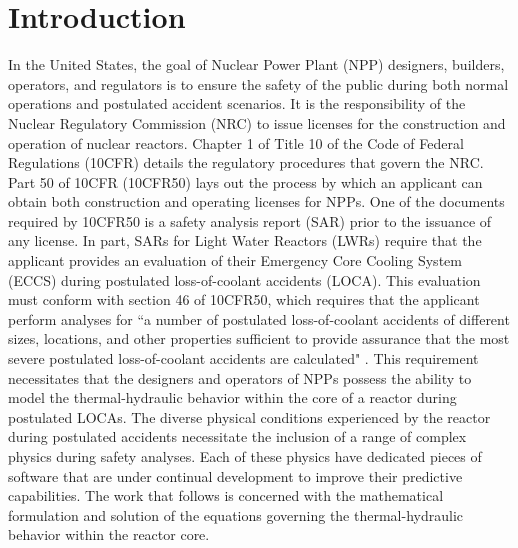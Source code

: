 \chapter{Introduction}
\label{chap:intro}
In the United States, the goal of Nuclear Power Plant (NPP) designers, builders, operators, and regulators is to ensure the safety of the public during both normal operations and postulated accident scenarios.
It is the responsibility of the Nuclear Regulatory Commission (NRC) to issue licenses for the construction and operation of nuclear reactors.
Chapter 1 of Title 10 of the Code of Federal Regulations (10CFR) details the regulatory procedures that govern the NRC.
Part 50 of 10CFR (10CFR50) lays out the process by which an applicant can obtain both construction and operating licenses for NPPs.
One of the documents required by 10CFR50 is a safety analysis report (SAR) prior to the issuance of any license.
In part, SARs for Light Water Reactors (LWRs) require that the applicant provides an evaluation of their Emergency Core Cooling System (ECCS) during postulated loss-of-coolant accidents (LOCA).
This evaluation must conform with section 46 of 10CFR50, which requires that the applicant perform analyses for ``a number of postulated loss-of-coolant accidents of different sizes, locations, and other properties sufficient to provide assurance that the most severe postulated loss-of-coolant accidents are calculated" \cite{CFR10}.
This requirement necessitates that the designers and operators of NPPs possess the ability to model the thermal-hydraulic behavior within the core of a reactor during postulated LOCAs.  
The diverse physical conditions experienced by the reactor during postulated accidents necessitate the inclusion of a range of complex physics during safety analyses.
Each of these physics have dedicated pieces of software that are under continual development to improve their predictive capabilities.
The work that follows is concerned with the mathematical formulation and solution of the equations governing the thermal-hydraulic behavior within the reactor core.

